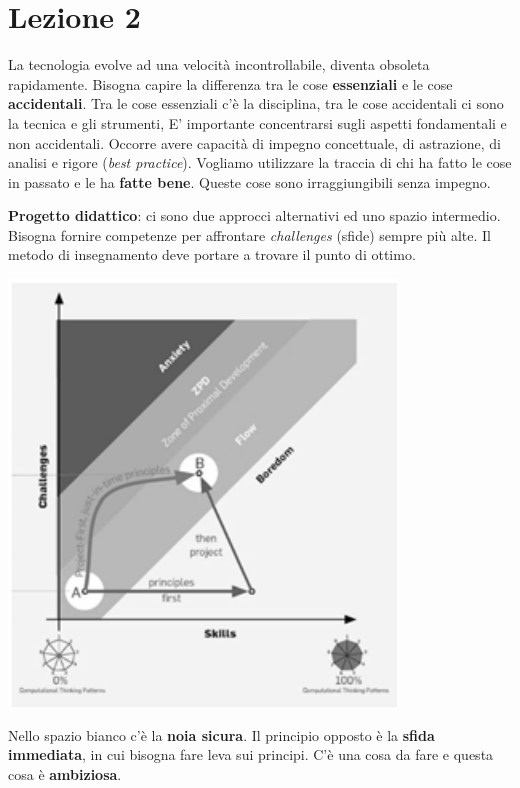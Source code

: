


\section{Lezione 2}

La tecnologia evolve ad una velocità incontrollabile, diventa obsoleta rapidamente. Bisogna capire la differenza tra le cose \textbf{essenziali} e le cose \textbf{accidentali}. Tra le cose essenziali c'è la disciplina, tra le cose accidentali ci sono la tecnica e gli strumenti, E' importante concentrarsi sugli aspetti fondamentali e non accidentali. Occorre avere capacità di impegno concettuale, di astrazione, di analisi e rigore (\textit{best practice}). Vogliamo utilizzare la traccia di chi ha fatto le cose in passato e le ha \textbf{fatte bene}. Queste cose sono irraggiungibili senza impegno.

\textbf{Progetto didattico}: ci sono due approcci alternativi ed uno spazio intermedio. Bisogna fornire competenze per affrontare \textit{challenges} (sfide) sempre più alte. Il metodo di insegnamento deve portare a trovare il punto di ottimo.

\begin{center}

\includegraphics[width=0.75\columnwidth]{img1} %

\end{center}

Nello spazio bianco c'è la \textbf{noia sicura}. Il principio opposto è la \textbf{sfida immediata}, in cui bisogna fare leva sui principi. C'è una cosa da fare e questa cosa è \textbf{ambiziosa}.

